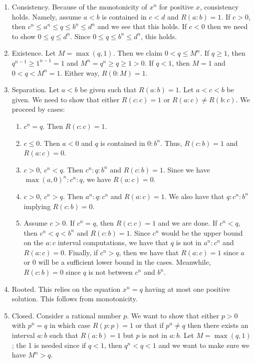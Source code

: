 \documentclass[12pt]{article}
\theoremstyle{remark}
\begin{document}
\begin{enumerate}
    \item Consistency. Because of the monotonicity of $x^n$ for positive $x$, consistency holds. Namely, assume $a\lt b$ is contained in $c \lt d$ and $R(a:b)=1$. If $c>0$, then $c^n \leq a^n \leq q \leq b^n \leq d^n$ and we see that this holds. If $c<0$ then we need to show $0 \leq q \leq d^n$. Since $0 \leq q \leq  b^n \leq d^n$, this holds. 
    \item Existence. Let $M = \max(q, 1)$. Then we claim $0 < q \leq M^n$. If $q \geq 1$, then $q^{n-1} \geq 1^{n-1} = 1$ and $M^n = q^n \geq q \geq 1 > 0$. If $ q < 1$, then $M=1$ and $0 < q < M^n = 1$. Either way, $R(0:M) = 1$. 
    \item Separation. Let $a\lt b$ be given such that $R(a:b)=1$. Let $a < c <b$ be given. We need to show that either $R(c:c) = 1$ or $R(a:c) \neq R(b:c)$. We proceed by cases:
    \begin{enumerate}
        \item $c^n = q$. Then $R(c:c) =1$.
        \item $c \leq 0$. Then $a<0$ and $q$ is contained in $0:b^n$. Thus, $R(c:b) = 1$ and $R(a:c) = 0$. 
        \item $c>0$, $c^n <q$. Then $c^n:q:b^n$ and $R(c:b)=1$. Since we have $\max(a, 0)^n :c^n:q$, we have $R(a:c)=0$. 
        \item $c>0$, $c^n > q$. Then $a^n:q:c^n$ and $R(a:c) = 1$. We also have that $q:c^n:b^n$ implying $R(c:b)=0$.
        \item Assume $c>0$. If $c^n = q$, then $R(c:c)=1$ and we are done. If $c^n < q$, then $c^n < q< b^n$ and $R(c:b)=1$. Since $c^n$ would be the upper bound on the $a:c$ interval computations, we have that $q$ is not in $a^n:c^n$ and $R(a:c)=0$. Finally, if $c^n > q$, then we have that $R(a:c)=1$ since $a$ or $0$ will be a sufficient lower bound in the cases. Meanwhile, $R(c:b) = 0$ since $q$ is not between $c^n$ and $b^n$. 
    \end{enumerate}
     \item Rooted. This relies on the equation $x^n = q$ having at most one positive solution. This follows from monotonicity. 
    \item Closed. Consider a rational number $p$. We want to show that either $p>0$ with $p^n = q$ in which case $R(p:p)=1$ or that if $p^n \neq q$ then there exists an interval $a:b$ such that $R(a:b)=1$ but $p$ is not in $a:b$. Let $M = \max(q, 1)$; the 1 is needed since if $q<1$, then $q^n < q < 1$ and we want to make sure we have $M^n > q$.
    

\end{enumerate}
\end{document}
